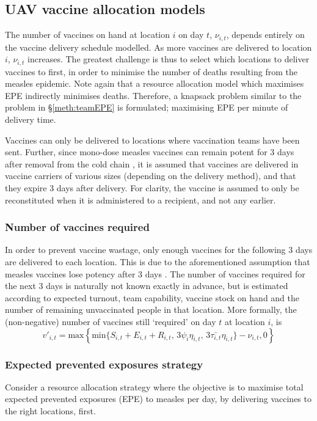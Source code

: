 \subsection{UAV vaccine allocation models} 
\label{sec:vd_strat}
The number of vaccines on hand at location $i$ on day $t$, $\nu_{i,t}$, depends entirely on the vaccine delivery schedule modelled. As more vaccines are delivered to location $i$, $\nu_{i,t}$ increases. The greatest challenge is thus to select which locations to deliver vaccines to first, in order to minimise the number of deaths resulting from the measles epidemic. Note again that a resource allocation model which maximises EPE indirectly minimises deaths. Therefore, a knapsack problem similar to the problem in \S \ref{meth:teamEPE} is formulated; maximising EPE per minute of delivery time.

Vaccines can only be delivered to locations where vaccination teams have been sent. Further, since mono-dose measles vaccines can remain potent for 3 days after removal from the cold chain \cite{msf_ectc_2018}, it is assumed that vaccines are delivered in vaccine carriers of various sizes (depending on the delivery method), and that they expire 3 days after delivery. For clarity, the vaccine is assumed to only be reconstituted when it is administered to a recipient, and not any earlier.

\subsubsection{Number of vaccines required}
In order to prevent vaccine wastage, only enough vaccines for the following 3 days are delivered to each location. This is due to the aforementioned assumption that measles vaccines lose potency after 3 days \cite{msf_ectc_2018}. The number of vaccines required for the next 3 days is naturally not known exactly in advance, but is estimated according to expected turnout, team capability, vaccine stock on hand and the number of remaining unvaccinated people in that location. More formally, the (non-negative) number of vaccines still `required' on day $t$ at location $i$, is 
$$v'_{i,t} = \text{max} \left\{ \text{min} \{S_{i,t} + E_{i,t} + R_{i,t}, \, 3 \psi_{i} \eta_{i,t}, \, 3 \bar{\tau_{i,t}} \eta_{i,t} \} - \nu_{i,t}, 0\right\}$$

\subsubsection{Expected prevented exposures strategy}
\label{sec:meth_EPE_strat}
Consider a resource allocation strategy where the objective is to maximise total expected prevented exposures (EPE) to measles per day, by delivering vaccines to the right locations, first.


